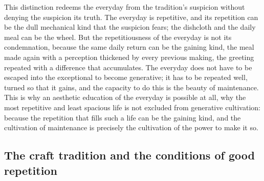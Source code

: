 
This distinction redeems the everyday from the tradition's suspicion without denying the suspicion its truth. The everyday is repetitive, and its repetition can be the dull mechanical kind that the suspicion fears; the dishcloth and the daily meal can be the wheel. But the repetitiousness of the everyday is not its condemnation, because the same daily return can be the gaining kind, the meal made again with a perception thickened by every previous making, the greeting repeated with a difference that accumulates. The everyday does not have to be escaped into the exceptional to become generative; it has to be repeated well, turned so that it gains, and the capacity to do this is the beauty of maintenance. This is why an aesthetic education of the everyday is possible at all, why the most repetitive and least spacious life is not excluded from generative cultivation: because the repetition that fills such a life can be the gaining kind, and the cultivation of maintenance is precisely the cultivation of the power to make it so.

\subsection{The craft tradition and the conditions of good repetition}
\label{p22:sub:maintenance-craft}


